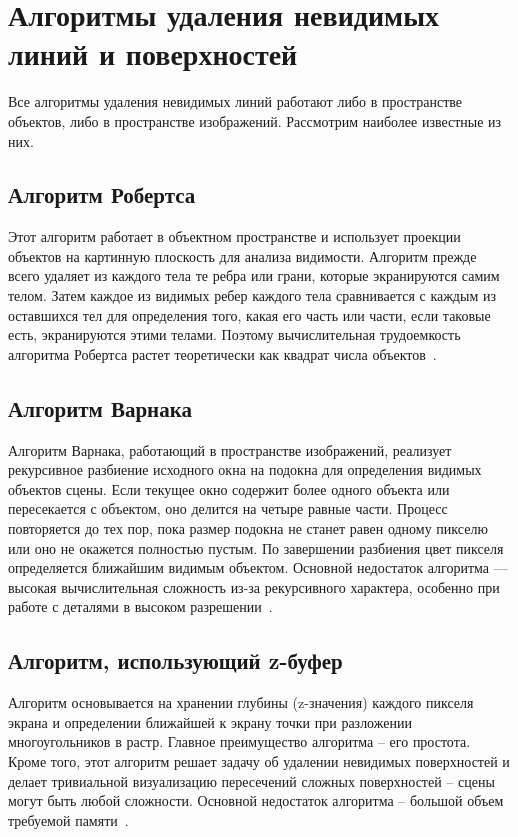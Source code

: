 \section{Алгоритмы удаления невидимых линий и поверхностей}
Все алгоритмы удаления невидимых линий работают либо в пространстве объектов, либо в пространстве изображений. Рассмотрим наиболее известные из них.
\subsection{Алгоритм Робертса}
Этот алгоритм работает в объектном пространстве и использует проекции объектов на картинную плоскость для анализа видимости. Алгоритм прежде всего удаляет из каждого тела те ребра или грани, которые экранируются самим телом. Затем каждое из видимых ребер каждого тела сравнивается с каждым из оставшихся тел для определения того, какая его часть или части, если таковые есть, экранируются этими телами. Поэтому вычислительная трудоемкость алгоритма Робертса растет теоретически как квадрат числа объектов~\cite{lit1,lit2}.

\subsection{Алгоритм Варнака}
Алгоритм Варнака, работающий в пространстве изображений, реализует рекурсивное разбиение исходного окна на подокна для определения видимых объектов сцены. Если текущее окно содержит более одного объекта или пересекается с объектом, оно делится на четыре равные части. Процесс повторяется до тех пор, пока размер подокна не станет равен одному пикселю или оно не окажется полностью пустым. По завершении разбиения цвет пикселя определяется ближайшим видимым объектом. Основной недостаток алгоритма — высокая вычислительная сложность из-за рекурсивного характера, особенно при работе с деталями в высоком разрешении~\cite{lit3}.

\subsection{Алгоритм, использующий z-буфер}

Алгоритм основывается на хранении глубины (z-значения) каждого пикселя экрана и определении ближайшей к экрану точки при разложении многоугольников в растр.
Главное преимущество алгоритма -- его простота. Кроме того, этот алгоритм решает задачу об удалении невидимых поверхностей и делает тривиальной визуализацию пересечений сложных поверхностей -- сцены могут быть любой сложности.
Основной недостаток алгоритма -- большой объем требуемой памяти~\cite{lit1}.


